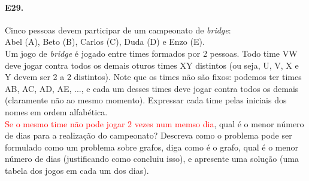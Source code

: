 \documentclass[11pt,a4paper,notitlepage]{exam}
\begin{document}
\paragraph{E29.} Cinco pessoas devem participar de um campeonato
de \textit{bridge}:\medskip\\
Abel (A), Beto (B), Carlos (C), Duda (D) e Enzo (E).\medskip\\
Um jogo de \textit{bridge} é jogado entre times formados por 2 pessoas.
Todo time VW deve jogar contra todos os demais oturos times XY
distintos (ou seja, U, V, X e Y devem ser 2 a 2 distintos). Note que
os times não são fixos: podemos ter times AB, AC, AD, AE, ..., e cada
um desses times deve jogar contra todos os demais (claramente não ao
mesmo momento). Expressar cada time pelas iniciais dos nomes em ordem
alfabética.\medskip\\
\textcolor{red}{Se o mesmo time não pode jogar 2 vezes num memso
dia}, qual é o menor número de dias para a realização do
campeonato? Descreva como o problema pode ser formulado como um problema
sobre grafos, diga como é o grafo, qual é o menor número de dias
(justificando como concluiu isso), e apresente uma solução (uma tabela
dos jogos em cada um dos dias).
\end{document}

